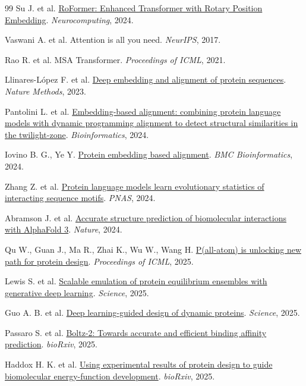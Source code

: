 \documentclass[10pt]{article}
\begin{document}
\begin{thebibliography}{99}
Su J. et al. \href{https://doi.org/10.1016/j.neucom.2023.127063}{RoFormer: Enhanced Transformer with Rotary Position Embedding}. \textit{Neurocomputing}, 2024.

Vaswani A. et al. Attention is all you need. \textit{NeurIPS}, 2017.

Rao R. et al. MSA Transformer. \textit{Proceedings of ICML}, 2021.

Llinares-L\'opez F. et al. \href{https://doi.org/10.1038/s41592-022-01700-2}{Deep embedding and alignment of protein sequences}. \textit{Nature Methods}, 2023.

Pantolini L. et al. \href{https://doi.org/10.1093/bioinformatics/btad786}{Embedding-based alignment: combining protein language models with dynamic programming alignment to detect structural similarities in the twilight-zone}. \textit{Bioinformatics}, 2024.

Iovino B. G., Ye Y. \href{https://doi.org/10.1186/s12859-024-05699-5}{Protein embedding based alignment}. \textit{BMC Bioinformatics}, 2024.

Zhang Z. et al. \href{https://doi.org/10.1073/pnas.2406285121}{Protein language models learn evolutionary statistics of interacting sequence motifs}. \textit{PNAS}, 2024.

Abramson J. et al. \href{https://doi.org/10.1038/s41586-024-07487-w}{Accurate structure prediction of biomolecular interactions with AlphaFold 3}. \textit{Nature}, 2024.

Qu W., Guan J., Ma R., Zhai K., Wu W., Wang H. \href{https://proceedings.mlr.press/v267/qu25c.html}{P(all-atom) is unlocking new path for protein design}. \textit{Proceedings of ICML}, 2025.

Lewis S. et al. \href{https://doi.org/10.1126/science.adv9817}{Scalable emulation of protein equilibrium ensembles with generative deep learning}. \textit{Science}, 2025.

Guo A. B. et al. \href{https://doi.org/10.1126/science.adr7094}{Deep learning-guided design of dynamic proteins}. \textit{Science}, 2025.

Passaro S. et al. \href{https://doi.org/10.1101/2025.06.14.659707}{Boltz-2: Towards accurate and efficient binding affinity prediction}. \textit{bioRxiv}, 2025.

Haddox H. K. et al. \href{https://doi.org/10.64898/2025.12.12.691241}{Using experimental results of protein design to guide biomolecular energy-function development}. \textit{bioRxiv}, 2025.

\end{thebibliography}
\end{document}
